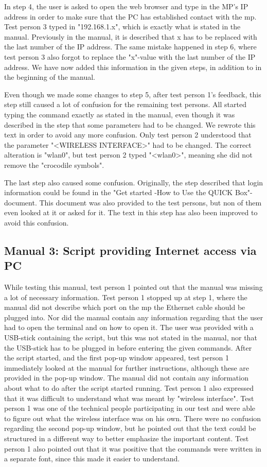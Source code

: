 In step 4, the user is asked to open the web browser and type in the MP's IP address in order to make sure that the PC has established contact with the \gls{mp}. Test person 3 typed in "192.168.1.x", which is exactly what is stated in the manual. Previously in the manual, it is described that x has to be replaced with the last number of the IP address. The same mistake happened in step 6, where test person 3 also forgot to replace the "x"-value with the last number of the IP address. We have now added this information in the given steps, in addition to in the beginning of the manual. 

Even though we made some changes to step 5, after test person 1's feedback, this step still caused a lot of confusion for the remaining test persons. All started typing the command exactly as stated in the manual, even though it was described in the step that some parameters had to be changed. We rewrote this text in order to avoid any more confusion. Only test person 2 understood that the parameter "<WIRELESS INTERFACE>" had to be changed. The correct alteration is "wlan0", but test person 2 typed "<wlan0>", meaning she did not remove the "crocodile symbols".

The last step also caused some confusion. Originally, the step described that login information could be found in the "Get started -How to Use the QUICK Box"-document. This document was also provided to the test persons, but non of them even looked at it or asked for it. The text in this step has also been improved to avoid this confusion.

\subsection{Manual 3: Script providing Internet access via PC}
While testing this manual, test person 1 pointed out that the manual was missing a lot of necessary information. Test person 1 stopped up at step 1, where the manual did not describe which port on the \gls{mp} the Ethernet cable should be plugged into. Nor did the manual contain any information regarding that the user had to open the terminal and on how to open it. The user was provided with a USB-stick containing the script, but this was not stated in the manual, nor that the USB-stick has to be plugged in before entering the given commands. After the script started, and the first pop-up window appeared, test person 1 immediately looked at the manual for further instructions, although these are provided in the pop-up window. The manual did not contain any information about what to do after the script started running. Test person 1 also expressed that it was difficult to understand what was meant by "wireless interface". Test person 1 was one of the technical people participating in our test and were able to figure out what the wireless interface was on his own. There were no confusion regarding the second pop-up window, but he pointed out that the text could be structured in a different way to better emphasize the important content.
Test person 1 also pointed out that it was positive that the commands were written in a separate font, since this made it easier to understand. 

